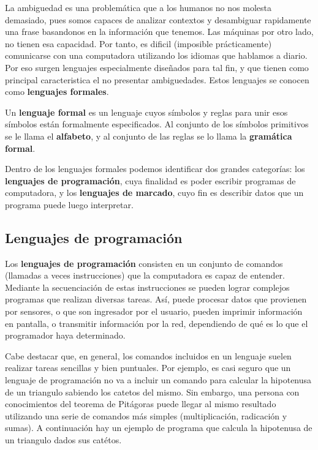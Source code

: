 La ambiguedad es una problemática que a los humanos no nos molesta demasiado,
pues somos capaces de analizar contextos y desambiguar rapidamente una frase
basandonos en la información que tenemos. Las máquinas por otro lado, no tienen
esa capacidad. Por tanto, es dificil (imposible prácticamente) comunicarse con
una computadora utilizando los idiomas que hablamos a diario. Por eso surgen
lenguajes especialmente diseñados para tal fin, y que tienen como principal
caracteristica el no presentar ambiguedades. Estos lenguajes se conocen como
\textbf{lenguajes formales}.

\begin{definition}
    Un \textbf{lenguaje formal} es un lenguaje cuyos símbolos y
    reglas para unir esos símbolos están formalmente especificados.
    Al conjunto de los símbolos primitivos se le llama el \textbf{alfabeto}, y
    al conjunto de las reglas se lo llama la \textbf{gramática formal}.\autocite{sunitha_2015}
\end{definition}

Dentro de los lenguajes formales podemos identificar dos grandes categorías:
los \textbf{lenguajes de programación}, cuya finalidad es poder escribir programas de
computadora, y los \textbf{lenguajes de marcado}, cuyo fin es describir datos que un 
programa puede luego interpretar.

\subsection{Lenguajes de programación}

Los \textbf{lenguajes de programación} consisten en un conjunto de comandos (llamadas
a veces instrucciones) que la computadora es capaz de entender. Mediante la
secuenciación de estas instrucciones se pueden lograr complejos programas que
realizan diversas tareas. Así, puede procesar datos que provienen por sensores,
o que son ingresador por el usuario, pueden imprimir información en pantalla,
o transmitir información por la red, dependiendo de qué es lo que el programador
haya determinado.

Cabe destacar que, en general, los comandos incluidos en un lenguaje suelen
realizar tareas sencillas y bien puntuales. Por ejemplo, es casi seguro que un
lenguaje de programación no va a incluir un comando para calcular la hipotenusa
de un triangulo sabiendo los catetos del mismo. Sin embargo, una persona con
conocimientos del teorema de Pitágoras puede llegar al mismo resultado utilizando
una serie de comandos más simples (multiplicación, radicación y sumas). A
continuación hay un ejemplo de programa que calcula la hipotenusa de un triangulo
dados sus catétos.


